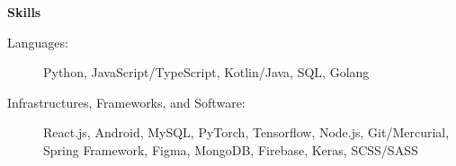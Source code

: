 \documentclass[letterpaper,11pt]{article}
\newcommand{\resheading}[1]{{\large \colorbox{mygrey}{\begin{minipage}{\textwidth}{\textbf{#1 \vphantom{p\^{E}}}}\end{minipage}}}}
\begin{document}

\resheading{Skills}

\begin{description}
\item[Languages:] Python, JavaScript/TypeScript, Kotlin/Java, SQL, Golang
\item[Infrastructures, Frameworks, and Software:] React.js, Android, MySQL, PyTorch, Tensorflow, Node.js, Git/Mercurial, Spring Framework, Figma, MongoDB, Firebase, Keras, SCSS/SASS
\end{description}

\end{document}
